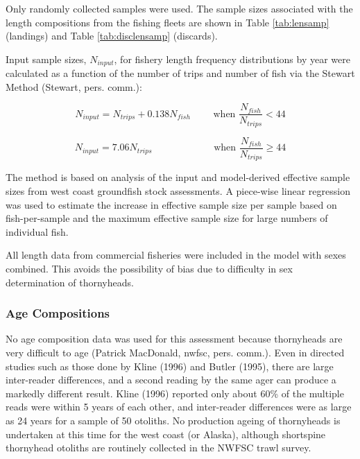 \documentclass[11pt,
  english,
  letterpaper,
]{article}
\begin{document}
Only randomly collected samples were used. The sample sizes associated with the length compositions from the fishing fleets are shown in Table \ref{tab:lensamp} (landings) and Table \ref{tab:disclensamp} (discards).

Input sample sizes, \({N_{input}}\), for fishery length frequency distributions by year were calculated as a function of the number of trips and number of fish via the Stewart Method (Stewart, pers. comm.):

\begin{equation} {N_{input} = N_{trips} + 0.138N_{fish}}\qquad\text{ when }\frac{N_{fish}}{N_{trips}}<44 \end{equation}

\begin{equation} {N_{input} = 7.06N_{trips}}\qquad\qquad\qquad\text{ when }\frac{N_{fish}}{N_{trips}}\ge 44 \end{equation}

The method is based on analysis of the input and model-derived effective sample sizes from west coast groundfish stock assessments. A piece-wise linear regression was used to estimate the increase in effective sample size per sample based on fish-per-sample and the maximum effective sample size for large numbers of individual fish.

All length data from commercial fisheries were included in the model with sexes combined. This avoids the possibility of bias due to difficulty in sex determination of thornyheads.

\hypertarget{age-compositions}{%
\subsubsection{Age Compositions}\label{age-compositions}}

No age composition data was used for this assessment because thornyheads are very difficult to age (Patrick MacDonald, \gls{nwfsc}, pers. comm.). Even in directed studies such as those done by Kline (1996) and Butler (1995), there are large inter-reader differences, and a second reading by the same ager can produce a markedly different result. Kline (1996) reported only about 60\% of the multiple reads were within 5 years of each other, and inter-reader differences were as large as 24 years for a sample of 50 otoliths. No production ageing of thornyheads is undertaken at this time for the west coast (or Alaska), although shortspine thornyhead otoliths are routinely collected in the NWFSC trawl survey.
\end{document}
